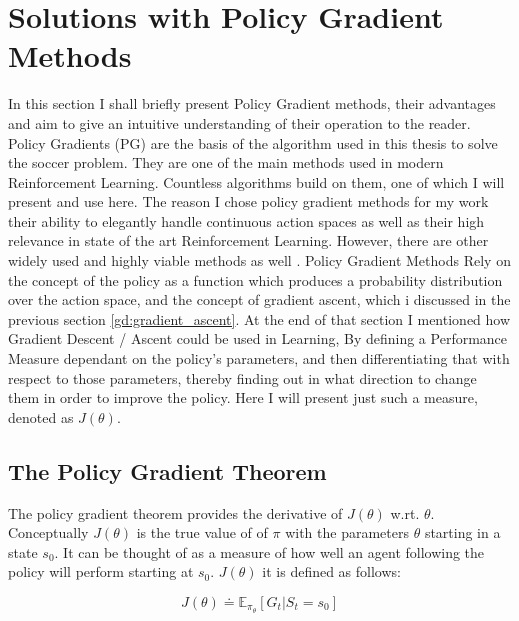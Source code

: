 \newpage
\section{Solutions with Policy Gradient Methods}\label{sec:policy_gradient}
\noindent
In this section I shall briefly present Policy Gradient methods, their advantages and aim to give an intuitive understanding of their operation to the reader. Policy Gradients (PG) are the basis of the algorithm used in this thesis to solve the soccer problem. They are one of the main methods used in modern Reinforcement Learning. Countless algorithms build on them, one of which I will present and use here. The reason I chose policy gradient methods for my work their ability to elegantly handle continuous action spaces as well as their high relevance in state of the art Reinforcement Learning. However, there are other widely used and highly viable methods as well \cite{arulkumaran_brief_2017}. Policy Gradient Methods Rely on the concept of the policy as a function which produces a probability distribution over the action space, and the concept of gradient ascent, which i discussed in the previous section \ref{gd:gradient_ascent}. At the end of that section I mentioned how Gradient Descent / Ascent could be used in Learning, By defining a Performance Measure dependant on the policy's parameters, and then differentiating that with respect to those parameters, thereby finding out in what direction to change them in order to improve the policy. Here I will present just such a measure, denoted as $J(\theta)$. 

\subsection{The Policy Gradient Theorem}\label{subsec:pg:theorem}
The policy gradient theorem provides the derivative of $J(\theta)$ w.rt. $\theta$. Conceptually $J(\theta)$ is the true value of of $\pi$ with the parameters $\theta$ starting in a state $s_0$. It can be thought of as a measure of how well an agent following the policy will perform starting at $s_0$. $J(\theta)$ it is defined as follows:

\begin{equation}\label{pg:performance_measure}
    J(\theta) \doteq \mathbb{E}_{\pi_\theta}[G_t|S_t=s_0]
\end{equation}

